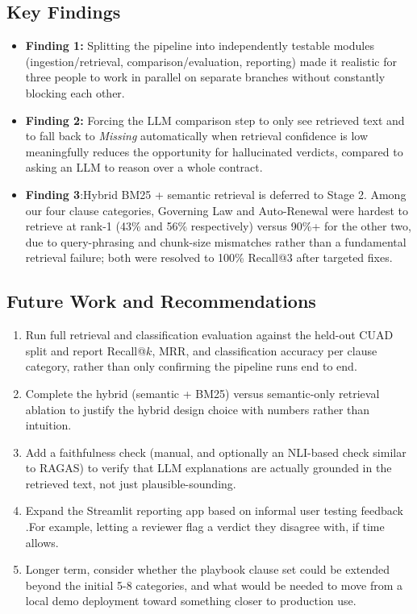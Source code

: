 \documentclass[11pt]{article}
\begin{document}
\subsection{Key Findings}

\begin{itemize}
  \item \textbf{Finding 1:} Splitting the pipeline into independently
    testable modules (ingestion/retrieval, comparison/evaluation,
    reporting) made it realistic for three people to work in parallel
    on separate branches without constantly blocking each other.
  \item \textbf{Finding 2:} Forcing the LLM comparison step to only see
    retrieved text and to fall back to \emph{Missing} automatically
    when retrieval confidence is low meaningfully reduces the
    opportunity for hallucinated verdicts, compared to asking an LLM to
    reason over a whole contract.
  \item \textbf{Finding 3}:{Hybrid BM25 + semantic retrieval is deferred to Stage 2. Among our four clause categories, Governing Law and Auto-Renewal were hardest to retrieve at rank-1 (43\% and 56\% respectively) versus 90\%+ for the other two, due to query-phrasing and chunk-size mismatches rather than a fundamental retrieval failure; both were resolved to 100\% Recall@3 after targeted fixes.} 
    
\end{itemize}

\subsection{Future Work and Recommendations}

\begin{enumerate}
  \item Run full retrieval and classification evaluation against the
    held-out CUAD split and report Recall@$k$, MRR, and classification
    accuracy per clause category, rather than only confirming the
    pipeline runs end to end.
  \item Complete the hybrid (semantic + BM25) versus semantic-only
    retrieval ablation to justify the hybrid design choice with numbers
    rather than intuition.
  \item Add a faithfulness check (manual, and optionally an NLI-based
    check similar to RAGAS) to verify that LLM explanations are
    actually grounded in the retrieved text, not just
    plausible-sounding.
  \item Expand the Streamlit reporting app based on informal user
    testing feedback .For example, letting a reviewer flag a verdict
    they disagree with, if time allows.
  \item Longer term, consider whether the playbook clause set could be
    extended beyond the initial 5-8 categories, and what would be
    needed to move from a local demo deployment toward something
    closer to production use.
\end{enumerate}
\end{document}
